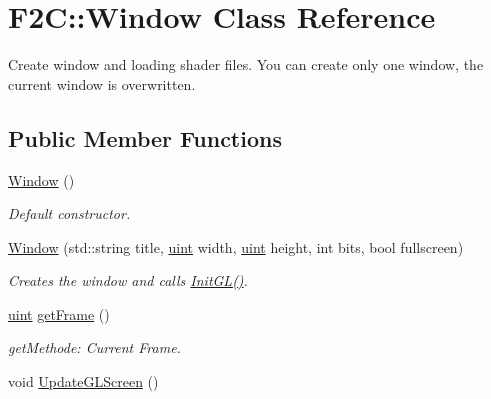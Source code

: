 \hypertarget{class_f2_c_1_1_window}{
\section{F2C::Window Class Reference}
\label{class_f2_c_1_1_window}
}


Create window and loading shader files. You can create only one window, the current window is overwritten.  


\subsection*{Public Member Functions}
\begin{DoxyCompactItemize}
\item 
\hypertarget{class_f2_c_1_1_window_af8e3a9c08630dc5b3594cdce80f534ef}{
\hyperlink{class_f2_c_1_1_window_af8e3a9c08630dc5b3594cdce80f534ef}{Window} ()}
\label{class_f2_c_1_1_window_af8e3a9c08630dc5b3594cdce80f534ef}

\begin{DoxyCompactList}\small\item\em Default constructor. \item\end{DoxyCompactList}\item 
\hyperlink{class_f2_c_1_1_window_a8f83398491031a6d28ad93154a69d9b9}{Window} (std::string title, \hyperlink{namespace_f2_c_a58be2bac9eb3e3c99cb41b6008bf4fae}{uint} width, \hyperlink{namespace_f2_c_a58be2bac9eb3e3c99cb41b6008bf4fae}{uint} height, int bits, bool fullscreen)
\begin{DoxyCompactList}\small\item\em Creates the window and calls \hyperlink{class_f2_c_1_1_window_ab3c3289418b453e215486ed6fb611f5a}{InitGL()}. \item\end{DoxyCompactList}\item 
\hypertarget{class_f2_c_1_1_window_a54df9471759b05ade2b6331bcbc01d2e}{
\hyperlink{namespace_f2_c_a58be2bac9eb3e3c99cb41b6008bf4fae}{uint} \hyperlink{class_f2_c_1_1_window_a54df9471759b05ade2b6331bcbc01d2e}{getFrame} ()}
\label{class_f2_c_1_1_window_a54df9471759b05ade2b6331bcbc01d2e}

\begin{DoxyCompactList}\small\item\em getMethode: Current Frame. \item\end{DoxyCompactList}\item 
\hypertarget{class_f2_c_1_1_window_a7c5e369664f3268c5d284c8d6991f8a1}{
void \hyperlink{class_f2_c_1_1_window_a7c5e369664f3268c5d284c8d6991f8a1}{UpdateGLScreen} ()}
\label{class_f2_c_1_1_window_a7c5e369664f3268c5d284c8d6991f8a1}


\end{DoxyCompactItemize}
